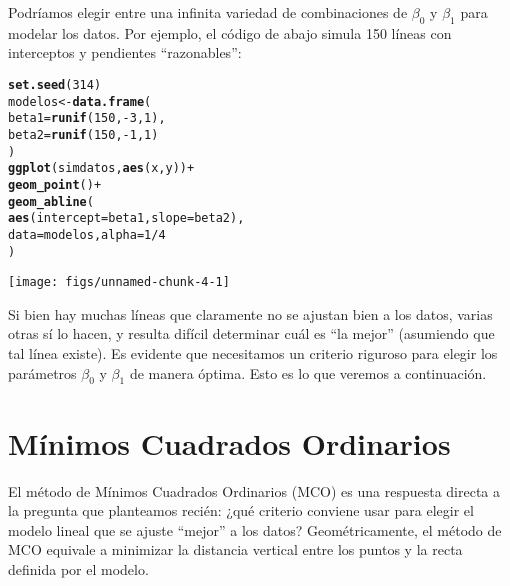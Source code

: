 \documentclass{report}\usepackage[]{graphicx}\usepackage[]{color}
\makeatletter
\newcommand{\hlnum}[1]{\textcolor[rgb]{0.686,0.059,0.569}{#1}}%
\newcommand{\hlopt}[1]{\textcolor[rgb]{0,0,0}{#1}}%
\newcommand{\hlstd}[1]{\textcolor[rgb]{0.345,0.345,0.345}{#1}}%
\newcommand{\hlkwb}[1]{\textcolor[rgb]{0.69,0.353,0.396}{#1}}%
\newcommand{\hlkwc}[1]{\textcolor[rgb]{0.333,0.667,0.333}{#1}}%
\newcommand{\hlkwd}[1]{\textcolor[rgb]{0.737,0.353,0.396}{\textbf{#1}}}%
\newenvironment{kframe}{%
 \def\at@end@of@kframe{}%
 \ifinner\ifhmode%
  \def\at@end@of@kframe{\end{minipage}}%
  \begin{minipage}{\columnwidth}%
 \fi\fi%
 \def\FrameCommand##1{\hskip\@totalleftmargin \hskip-\fboxsep
 \colorbox{shadecolor}{##1}\hskip-\fboxsep
     \hskip-\linewidth \hskip-\@totalleftmargin \hskip\columnwidth}%
 \MakeFramed {\advance\hsize-\width
   \@totalleftmargin\z@ \linewidth\hsize
   \@setminipage}}%
 {\par\unskip\endMakeFramed%
 \at@end@of@kframe}
\newenvironment{knitrout}{}{} %
\makeatother
\begin{document}
Podríamos elegir entre una infinita variedad de combinaciones de $\beta_0$ y $\beta_1$ para modelar los datos. Por ejemplo, el código de abajo simula 150 líneas con interceptos y pendientes ``razonables'':

\begin{knitrout}
\color{fgcolor}\begin{kframe}
\begin{alltt}
\hlkwd{set.seed}\hlstd{(}\hlnum{314}\hlstd{)}
\hlstd{modelos} \hlkwb{<-} \hlkwd{data.frame}\hlstd{(}
  \hlkwc{beta1} \hlstd{=} \hlkwd{runif}\hlstd{(}\hlnum{150}\hlstd{,} \hlopt{-}\hlnum{3}\hlstd{,} \hlnum{1}\hlstd{),}
  \hlkwc{beta2} \hlstd{=} \hlkwd{runif}\hlstd{(}\hlnum{150}\hlstd{,} \hlopt{-}\hlnum{1}\hlstd{,} \hlnum{1}\hlstd{)}
\hlstd{)}
\hlkwd{ggplot}\hlstd{(simdatos,} \hlkwd{aes}\hlstd{(x, y))} \hlopt{+}
  \hlkwd{geom_point}\hlstd{()} \hlopt{+}
  \hlkwd{geom_abline}\hlstd{(}
    \hlkwd{aes}\hlstd{(}\hlkwc{intercept} \hlstd{= beta1,} \hlkwc{slope} \hlstd{= beta2),}
    \hlkwc{data} \hlstd{= modelos,} \hlkwc{alpha} \hlstd{=} \hlnum{1}\hlopt{/}\hlnum{4}
  \hlstd{)}
\end{alltt}
\end{kframe}

{\centering \texttt{[image: figs/unnamed-chunk-4-1]} 

}



\end{knitrout}

Si bien hay muchas líneas que claramente no se ajustan bien a los datos, varias otras sí lo hacen, y resulta difícil determinar cuál es ``la mejor'' (asumiendo que tal línea existe).
Es evidente que necesitamos un criterio riguroso para elegir los parámetros $\beta_0$ y $\beta_1$ de manera óptima.
Esto es lo que veremos a continuación.


\section{Mínimos Cuadrados Ordinarios}
\label{sec:MCO}

El método de Mínimos Cuadrados Ordinarios (MCO) es una respuesta directa a la pregunta que planteamos recién: ¿qué criterio conviene usar para elegir el modelo lineal que se ajuste ``mejor'' a los datos?
Geométricamente, el método de MCO equivale a minimizar la distancia vertical entre los puntos y la recta definida por el modelo.
\end{document}
